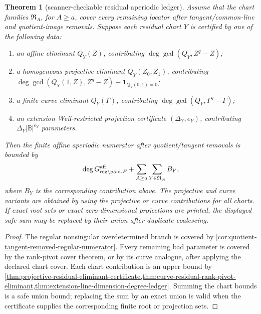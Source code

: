 \documentclass[11pt]{article}
\newtheorem{theorem}{Theorem}[section]
\theoremstyle{definition}
\theoremstyle{remark}
\newcommand{\B}{\mathbb{B}}
\begin{document}
\begin{theorem}[scanner-checkable residual aperiodic ledger]
\label{thm:scanner-checkable-residual-aperiodic-ledger}
Assume that the chart families $\mathfrak R_A$, for $A\ge a$, cover every
remaining locator after tangent/common-line and quotient-image removals.  Suppose
each residual chart $Y$ is certified by one of the following data:
\begin{enumerate}[label=\textup{(\roman*)},leftmargin=2.2em]
\item an affine eliminant $Q_Y(Z)$, contributing
$\deg\gcd(Q_Y,Z^q-Z)$;
\item a homogeneous projective eliminant $Q_Y(Z_0,Z_1)$, contributing
$\deg\gcd(Q_Y(1,Z),Z^q-Z)+\mathbf 1_{Q_Y(0,1)=0}$;
\item a finite curve eliminant $Q_Y(\Gamma)$, contributing
$\deg\gcd(Q_Y,\Gamma^q-\Gamma)$;
\item an extension Weil-restricted projection certificate $(\Delta_Y,e_Y)$,
contributing $\Delta_Y|\B|^{e_Y}$ parameters.
\end{enumerate}
Then the finite affine aperiodic numerator after quotient/tangent removals is
bounded by
\[
        \deg G_{{\rm reg}\setminus{\rm paid},F}^{\rm aff}
        +\sum_{A\ge a}\sum_{Y\in\mathfrak R_A} B_Y,
\]
where $B_Y$ is the corresponding contribution above.  The projective and curve
variants are obtained by using the projective or curve contributions for all
charts.  If exact root sets or exact zero-dimensional projections are printed,
the displayed safe sum may be replaced by their union after duplicate
coalescing.
\end{theorem}

\begin{proof}
The regular nonsingular overdetermined branch is covered by
\cref{cor:quotient-tangent-removed-regular-numerator}.  Every remaining bad
parameter is covered by the rank-pivot cover theorem, or by its curve analogue,
after applying the declared chart cover.  Each chart contribution is an upper
bound by \cref{thm:projective-residual-eliminant-certificate,thm:curve-residual-rank-pivot-eliminant,thm:extension-line-dimension-degree-ledger}.  Summing the
chart bounds is a safe union bound; replacing the sum by an exact union is valid
when the certificate supplies the corresponding finite root or projection sets.
\end{proof}
\end{document}
